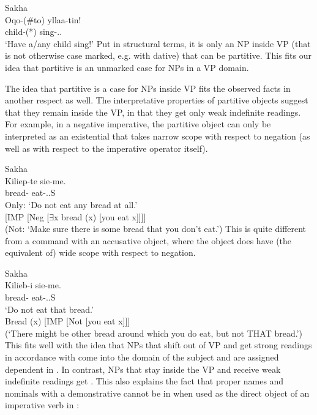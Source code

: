 \documentclass[output=paper]{langsci/langscibook}
\begin{document}
\ea\label{ex:key:12.5}Sakha\\
	\gll    Oqo-(\#to)  yllaa-tin!\\
		    child-(*\Part{})  sing-\Imp{}.\Tsg.\Sbj{}\\
	\glt    ‘Have a/any child sing!’
\z
Put in structural terms, it is only an NP inside VP (that is not otherwise case
marked, e.g. with dative) that can be partitive. This fits our idea that
partitive is an unmarked case for NPs in a VP domain.

The idea that partitive is a case for NPs inside VP fits the observed facts in
another respect as well. The interpretative properties of partitive objects
suggest that they remain inside the VP, in that they get only weak indefinite
readings.  For example, in a negative imperative, the partitive object can only
be interpreted as an existential that takes narrow scope with respect to
negation (as well as with respect to the imperative operator itself).

\ea\label{ex:key:12.6}Sakha\\
	\gll Kiliep-te  sie-me.\\
		bread-\Part{} eat-\Imp{}.\Neg{}.\Ssg{}S\\
	\glt Only: ‘Do not eat any bread at all.’\\
		 {}[IMP [Neg [${\exists}$x bread (x) [you eat x]]]]\\
		(Not: ‘Make sure there is some bread that you don’t eat.’)
\z
This is quite different from a command with an accusative object, where the
object does have (the equivalent of) wide scope with respect to negation.

\ea\label{ex:key:12.7}Sakha\\
	\gll Kilieb-i  sie-me.\\
		bread-\Acc{}  eat-\Imp{}.\Neg{}.\Ssg{}S\\
	\glt ‘Do not eat that bread.’\\
		Bread (x) [IMP [Not [you eat x]]]\\
		(‘There might be other bread around which you do eat, but not THAT bread.’)
\z
This fits well with the idea that NPs that shift out of VP and get strong
readings in accordance with   come into
the domain of the subject and are assigned dependent  in .
In contrast, NPs that stay inside the VP and receive weak indefinite readings
get .  This also explains the fact that proper names and nominals
with a demonstrative cannot be in  when used as the direct object
of an imperative verb in :
\end{document}

